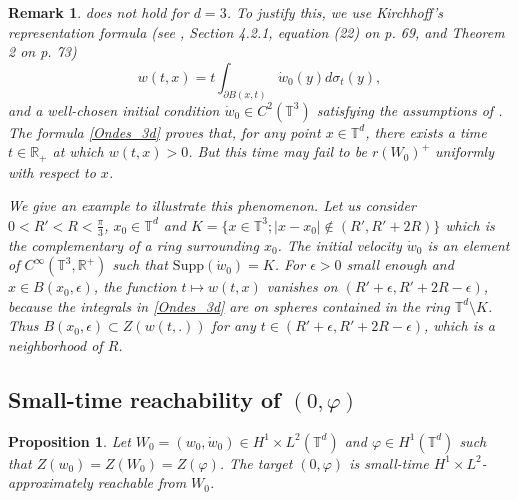 \documentclass[a4paper]{article}
\theoremstyle{plain}
\newtheorem{remark}[theorem]{Remark}
\newtheorem{proposition}[theorem]{Proposition}
\newcommand{\T}{\mathbb{T}}
\newcommand{\R}{\mathbb{R}}
\begin{document}
\begin{remark}
     does not hold for $d=3$. To justify this, we use Kirchhoff’s representation formula (see \cite{evans-book}, Section 4.2.1, equation (22) on p. 69, and Theorem 2 on p. 73) 
    \begin{equation} \label{Ondes_3d}
    w(t,x)=t \int_{\partial B (x,t)} \dot{w}_0(y) d\sigma_t (y),
    \end{equation}
    and a well-chosen initial condition 
    $\dot{w}_0 \in C^2(\T^3)$ satisfying the assumptions of .
    The formula \eqref{Ondes_3d} proves that, for any point $x \in \T^d$, there exists a time $t \in \R_+$ at which $w(t,x)>0$. But this time may fail to be $r(W_0)^+$ uniformly with respect to $x$. 
    
    We give an example to illustrate this phenomenon. 
    Let us consider
    $0<R'<R<\frac{\pi}{3}$, 
    $x_0 \in \T^d$ and 
    $K=\{ x \in \T^3 ; |x-x_0| \notin (R',R'+2R) \}$ 
    which is the complementary of a ring surrounding $x_0$.
    The initial velocity $\dot{w}_0$ is an element of $C^{\infty}(\T^3,\R^+)$ such that $\text{Supp}(\dot{w}_0)=K$.
    For $\epsilon>0$ small enough and $x \in B(x_0,\epsilon)$, the function
    $t \mapsto w(t,x)$ vanishes on $(R'+\epsilon,R'+2R-\epsilon)$, because the integrals in \eqref{Ondes_3d} are on spheres contained in the ring $\T^d \setminus K$. Thus 
    $B(x_0,\epsilon) \subset Z( w(t,.) )$ for any $t \in (R'+\epsilon,R'+2R-\epsilon)$, which is a neighborhood of $R$. 
    
\end{remark}




\subsection{Small-time reachability of $(0,\varphi)$}
\label{subsec:Reach0phi}



\begin{proposition} \label{Prop:reach0varphi}
Let $W_0=(w_0,\dot{w}_0) \in H^1 \times L^2(\T^d)$ and $\varphi \in H^1(\T^d)$ such that $Z(w_0)=Z(W_0)=Z(\varphi)$. The target $(0,\varphi)$ is small-time $H^1 \times L^2$-approximately reachable from $W_0$.
\end{proposition}
\end{document}
